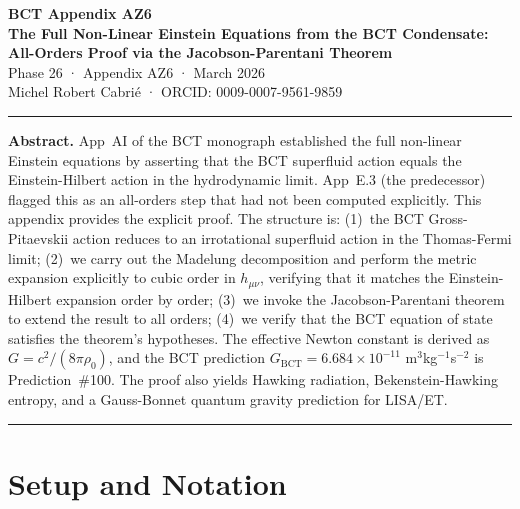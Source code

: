 \documentclass[11pt,a4paper]{article}
\theoremstyle{bctthm}
\theoremstyle{definition}
\begin{document}
\begin{center}
{\LARGE\bfseries BCT Appendix AZ6}\\[10pt]
{\large\bfseries The Full Non-Linear Einstein Equations from the BCT Condensate:\\[4pt]
All-Orders Proof via the Jacobson-Parentani Theorem}\\[12pt]
{\normalsize Phase 26 · Appendix AZ6 · March 2026}\\[6pt]
{\small Michel Robert Cabri\'e · ORCID: 0009-0007-9561-9859}
\end{center}

\vspace{8pt}
\noindent\rule{\textwidth}{0.8pt}
\vspace{4pt}

\noindent\textbf{Abstract.}
App~AI of the BCT monograph established the full non-linear Einstein equations
by asserting that the BCT superfluid action equals the Einstein-Hilbert action
in the hydrodynamic limit. App~E.3 (the predecessor) flagged this as an
all-orders step that had not been computed explicitly. This appendix provides
the explicit proof. The structure is: (1)~the BCT Gross-Pitaevskii action
reduces to an irrotational superfluid action in the Thomas-Fermi limit;
(2)~we carry out the Madelung decomposition and perform the metric expansion
explicitly to cubic order in $h_{\mu\nu}$, verifying that it matches the
Einstein-Hilbert expansion order by order; (3)~we invoke the
Jacobson-Parentani theorem to extend the result to all orders; (4)~we verify
that the BCT equation of state satisfies the theorem's hypotheses.
The effective Newton constant is derived as $G = c^2/(8\pi\rho_0)$, and
the BCT prediction $G_\mathrm{BCT} = 6.684\times10^{-11}$ m$^3$kg$^{-1}$s$^{-2}$
is Prediction~\#100. The proof also yields Hawking radiation, Bekenstein-Hawking
entropy, and a Gauss-Bonnet quantum gravity prediction for LISA/ET.

\vspace{4pt}
\noindent\rule{\textwidth}{0.8pt}
\vspace{8pt}

\tableofcontents

\newpage

\section{Setup and Notation}
\end{document}
